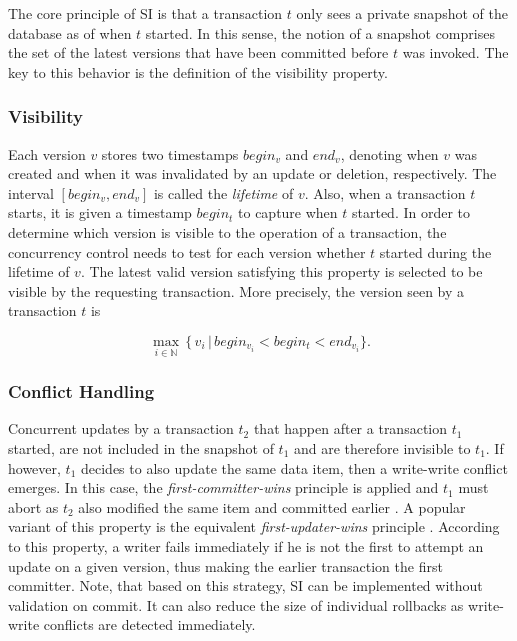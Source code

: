 The core principle of \ac{SI} is that a transaction $t$ only sees a private
snapshot of the database as of when $t$ started. In this sense, the notion of a
snapshot comprises the set of the latest versions that have been committed
before $t$ was invoked. The key to this behavior is the definition of the
visibility property.

\subsubsection{Visibility}

Each version $v$ stores two timestamps $begin_v$ and $end_v$, denoting when $v$
was created and when it was invalidated by an update or deletion, respectively.
The interval $[begin_v,  end_v]$ is called the \emph{lifetime} of $v$. Also,
when a transaction $t$ starts, it is given a timestamp $begin_t$ to capture when
$t$ started. In order to determine which version is visible to the operation of
a transaction, the concurrency control needs to test for each version whether
$t$ started during the lifetime of $v$. The latest valid version satisfying this
property is selected to be visible by the requesting transaction. More
precisely, the version seen by a transaction $t$ is

\[
\operatorname*{max}_{i \in \mathbb{N}}\, \{\, v_i\, |\, begin_{v_i} < begin_t < end_{v_i}\}.
\]

\subsubsection{Conflict Handling}
\label{ch:kvs-cc-conflicts}

Concurrent updates by a transaction $t_2$ that happen after a transaction $t_1$
started, are not included in the snapshot of $t_1$ and are therefore invisible
to $t_1$. If however, $t_1$ decides to also update the same data item, then a
write-write conflict emerges. In this case, the \emph{first-committer-wins}
principle is applied and $t_1$ must abort as $t_2$ also modified the same item
and committed earlier \cite{berenson1995critique}. A popular variant of this
property is the equivalent \emph{first-updater-wins} principle
\cite{fekete2004read, larson2011high}. According to this property, a writer
fails immediately if he is not the first to attempt an update on a given
version, thus making the earlier transaction the first committer. Note, that
based on this strategy, \ac{SI} can be implemented without validation on commit.
It can also reduce the size of individual rollbacks as write-write conflicts are
detected immediately.

